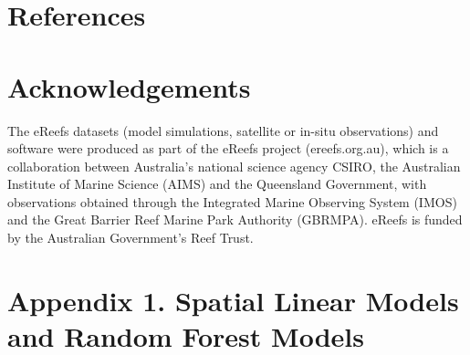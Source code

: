 \documentclass[
  letterpaper,
  DIV=11,
  numbers=noendperiod]{scrartcl}
\begin{document}
\clearpage

\section*{References}\label{references}

\renewcommand{\bibsection}{}


\section{Acknowledgements}\label{acknowledgements}

The eReefs datasets (model simulations, satellite or in-situ
observations) and software were produced as part of the eReefs project
(ereefs.org.au), which is a collaboration between Australia's national
science agency CSIRO, the Australian Institute of Marine Science (AIMS)
and the Queensland Government, with observations obtained through the
Integrated Marine Observing System (IMOS) and the Great Barrier Reef
Marine Park Authority (GBRMPA). eReefs is funded by the Australian
Government's Reef Trust.

\clearpage

\section*{Appendix 1. Spatial Linear Models and Random Forest
Models}\label{appendix-1.-spatial-linear-models-and-random-forest-models}
\end{document}
